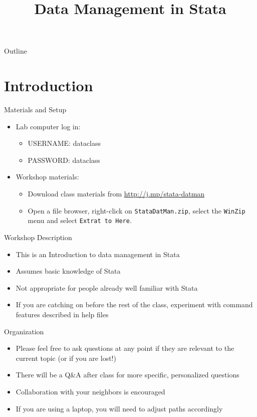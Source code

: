 \documentclass[table,smaller]{beamer}
\institute{Harvard MIT Data Center}
\author{}
\date{}
\title{Data Management in Stata}
\begin{document}
\maketitle
\begin{frame}{Outline}
\tableofcontents
\end{frame}


\section{Introduction}
\label{sec-1}

\begin{frame}[fragile,label=sec-1-1]{Materials and Setup}
 \begin{itemize}
\item Lab computer log in:
\begin{itemize}
\item USERNAME: dataclass
\item PASSWORD: dataclass
\end{itemize}
\item Workshop materials:
\begin{itemize}
\item Download class materials from \url{http://j.mp/stata-datman}
\item Open a file browser, right-click on \texttt{StataDatMan.zip}, select the \texttt{WinZip} menu and select \texttt{Extrat to Here}.
\end{itemize}
\end{itemize}
\end{frame}
\begin{frame}[label=sec-1-2]{Workshop Description}
\begin{itemize}
\item This is an Introduction to data management in Stata
\item Assumes basic knowledge of Stata
\item Not appropriate for people already well familiar with Stata
\item If you are catching on before the rest of the class, experiment with command features described in help files
\end{itemize}
\end{frame}
\begin{frame}[label=sec-1-3]{Organization}
\begin{itemize}
\item Please feel free to ask questions at any point if they are relevant to the current topic (or if you are lost!)
\item There will be a Q\&A after class for more specific, personalized questions
\item Collaboration with your neighbors is encouraged
\item If you are using a laptop, you will need to adjust paths accordingly
\end{itemize}
\end{frame}
\end{document}
